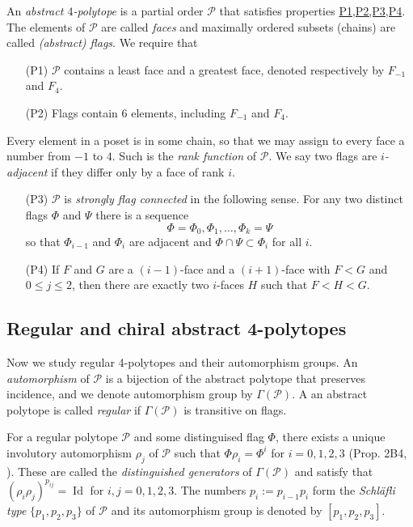 \documentclass{article}
\theoremstyle{definition}
\newcommand{\p}{\mathcal{P}}
\DeclareMathOperator{\Id}{Id}
\begin{document}
	An \textit{abstract $4$-polytope} is a partial order $\p$ that satisfies properties \hyperref[P1,P2,P3,P4]{P1,P2,P3,P4}. The elements of $\p$ are called \textit{faces} and maximally ordered subsets (chains) are called \textit{(abstract) flags}. We require that
	\begin{enumerate}
		\item[(P1)]\label{P1} $\p$ contains a least face and a greatest face, denoted respectively by $F_{-1}$ and $F_4$.
		\item[(P2)]\label{P2} Flags contain $6$ elements, including $F_{-1}$ and $F_4$.
	\end{enumerate}
	Every element in a poset is in some chain, so that we may assign to every face a number from $-1$ to $4$. Such is the \textit{rank function} of $\p$. We say two flags are \textit{$i$-adjacent} if they differ only by a face of rank $i$.
	\begin{enumerate}
		\item[(P3)]\label{P3} $\p$ is \textit{strongly flag connected} in the following sense. For any two distinct flags $\Phi$ and $\Psi$ there is a sequence
		\[\Phi=\Phi_0,\Phi_1,\ldots,\Phi_k=\Psi\]
		so that $\Phi_{i-1}$ and $\Phi_i$ are adjacent and $\Phi\cap\Psi\subset\Phi_i$ for all $i$.
		\item[(P4)]\label{P4} If $F$ and $G$ are a $(i-1)$-face and a $(i+1)$-face with $F<G$ and $0\leq j\leq2$, then there are exactly two $i$-faces $H$ such that $F<H<G$.
	\end{enumerate}
	
		\subsection{Regular and chiral abstract 4-polytopes}
	Now we study regular 4-polytopes and their automorphism groups. An \textit{automorphism} of $\p$ is a bijection of the abstract polytope that preserves incidence, and we denote automorphism group by $\Gamma(\p)$. A an abstract polytope is called \textit{regular} if $\Gamma(\p)$ is transitive on flags.
	
	For a regular polytope $\p$ and some distinguised flag $\Phi$, there exists a unique involutory automorphism $\rho_j$ of $\p$ such that $\Phi\rho_i=\Phi^i$ for $i=0,1,2,3$ (Prop. 2B4, \cite{abstract-polytopes}). These are called the \textit{distinguished generators} of $\Gamma(\p)$ and satisfy that $(\rho_i\rho_j)^{p_{ij}}=\Id$ for $i,j=0,1,2,3$. The numbers $p_i:=p_{i-1}p_i$ form the \textit{Schläfli type} $\{p_1,p_2,p_3\}$ of $\p$ and its automorphism group is denoted by $[p_1,p_2,p_3]$.
	
\end{document}
